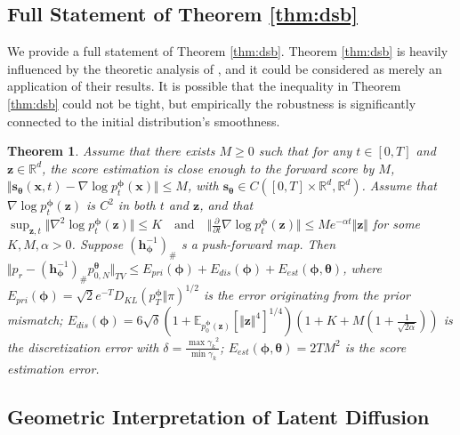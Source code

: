 \documentclass{article}
\newtheorem{theorem}{Theorem}\newtheorem{proposition}{Proposition}
\theoremstyle{definition}
\theoremstyle{remark}
\begin{document}
	\subsection{Full Statement of Theorem \ref{thm:dsb}}\label{appendix:dsb}
	We provide a full statement of Theorem \ref{thm:dsb}. Theorem \ref{thm:dsb} is heavily influenced by the theoretic analysis of \citet{de2021diffusion, guth2022wavelet}, and it could be considered as merely an application of their results. It is possible that the inequality in Theorem \ref{thm:dsb} could not be tight, but empirically the robustness is significantly connected to the initial distribution's smoothness.
	\begingroup
	\renewcommand\thetheorem{4}
	\begin{theorem}
		Assume that there exists $M\ge 0$ such that for any $t\in[0,T]$ and $\mathbf{z}\in\mathbb{R}^{d}$, the score estimation is close enough to the forward score by $M$, $\Vert\mathbf{s}_{\bm{\theta}}(\mathbf{x},t)-\nabla\log{p_{t}^{\bm{\phi}}(\mathbf{x})}\Vert\le M$, with $\mathbf{s}_{\bm{\theta}}\in C([0,T]\times\mathbb{R}^{d},\mathbb{R}^{d})$. Assume that $\nabla\log{p_{t}^{\bm{\phi}}(\mathbf{z})}$ is $C^{2}$ in both $t$ and $\mathbf{z}$, and that $\sup_{\mathbf{z},t}\Vert\nabla^{2}\log{p_{t}^{\bm{\phi}}(\mathbf{z})}\Vert\le K\quad\text{and}\quad\Vert\frac{\partial}{\partial t}\nabla\log{p_{t}^{\bm{\phi}}(\mathbf{z})}\Vert\le M e^{-\alpha t}\Vert\mathbf{z}\Vert$ for some $K,M,\alpha>0$. Suppose $(\mathbf{h}_{\bm{\phi}}^{-1})_{\#}$ s a push-forward map. Then $\Vert p_{r}-(\mathbf{h}_{\bm{\phi}}^{-1})_{\#}p_{0,N}^{\bm{\theta}}\Vert_{TV}\le E_{pri}(\bm{\phi})+E_{dis}(\bm{\phi})+E_{est}(\bm{\phi},\bm{\theta})$, where $E_{pri}(\bm{\phi})=\sqrt{2}e^{-T}D_{KL}(p_{T}^{\bm{\phi}}\Vert\pi)^{1/2}$ is the error originating from the prior mismatch; $E_{dis}(\bm{\phi})=6\sqrt{\delta}(1+\mathbb{E}_{p_{0}^{\bm{\phi}}(\mathbf{z})}[\Vert\mathbf{z}\Vert^{4}]^{1/4})(1+K+M(1+\frac{1}{\sqrt{2\alpha}}))$ is the discretization error with $\delta=\frac{\max{\gamma_{k}}^{2}}{\min{\gamma_{k}}}$; $E_{est}(\bm{\phi},\bm{\theta})=2TM^{2}$ is the score estimation error.
	\end{theorem}
	\endgroup
	
	\subsection{Geometric Interpretation of Latent Diffusion}\label{appendix:latent_manifold}
	
\end{document}
